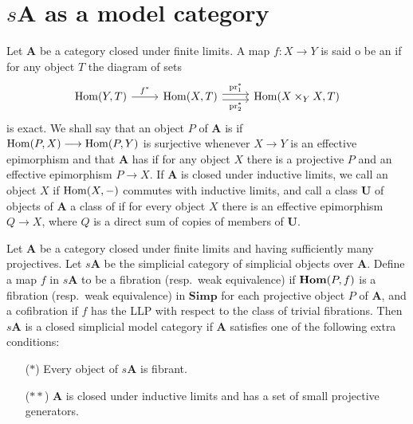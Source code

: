 \documentclass[../main]{subfiles}
\begin{document}
\section{\texorpdfstring{$s\mathbf{A}$}{sA} as a model category}\label{sec:2.4}

Let $\mathbf{A}$ be a category closed under finite limits. A map $f \colon X \longrightarrow Y$ is said o be an  if for any object $T$ the diagram of sets 
\[
\begin{tikzcd}
    {\Hom(Y, T)}
    \arrow[r, "f^*"]
    &
    {\Hom(X, T)}
    \arrow[r, "\pr^*_1", shift left]
    \arrow[r, "\pr^*_2"', shift right]
    &
    {\Hom(X \times_Y X, T)}
\end{tikzcd}
\]
is exact. We shall say that an object $P$ of $\mathbf{A}$ is  if \\$\operatorname{Hom}(P, X) \longrightarrow \operatorname{Hom}(P, Y)$ is surjective whenever $X \longrightarrow Y$ is an effective epimorphism and that $\mathbf{A}$ has  if for any object $X$ there is a projective $P$ and an effective epimorphism $P \longrightarrow X$. If $\mathbf{A}$ is closed under inductive limits, we call an object $X$  if $\operatorname{Hom}(X, -)$ commutes with  inductive limits, and call a class $\mathbf{U}$ of objects of $\mathbf{A}$ a class of  if for every object $X$ there is an effective epimorphism $Q \longrightarrow X$, where $Q$ is a direct sum of copies of members of $\mathbf{U}$. 

\begin{theorem}
\label{thm:2.4}
Let $\mathbf{A}$ be a category closed under finite limits and having sufficiently many projectives. Let $s\mathbf{A}$ be the simplicial category of simplicial objects over $\mathbf{A}$. Define a map $f$ in $s\mathbf{A}$ to be a fibration (resp.\ weak equivalence) if $\operatorname{\mathbf{Hom}}(P, f)$ is a fibration (resp.\ weak equivalence) in $\mathbf{Simp}$ for each projective object $P$ of $\mathbf{A}$, and a cofibration if $f$ has the LLP with respect to the class of trivial fibrations. Then $s\mathbf{A}$ is a closed simplicial model category if $\mathbf{A}$ satisfies one of the following extra conditions:
\begin{enumerate}
    \item[($\ast$)] 
    Every object of $s\mathbf{A}$ is fibrant. 
    
    \item[($\ast\ast$)] 
    $\mathbf{A}$ is closed under inductive limits and has a set of small projective generators.
\end{enumerate}
\end{theorem}
\end{document}
